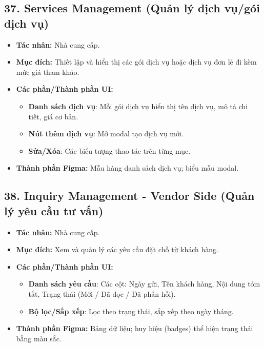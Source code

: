 \documentclass[11pt,a4paper]{article}
\begin{document}
\subsection{37. Services Management (Quản lý dịch vụ/gói dịch vụ)}
\begin{itemize}
    \item \textbf{Tác nhân:} Nhà cung cấp.
    \item \textbf{Mục đích:} Thiết lập và hiển thị các gói dịch vụ hoặc dịch vụ đơn lẻ đi kèm mức giá tham khảo.
    \item \textbf{Các phần/Thành phần UI:}
    \begin{itemize}
        \item \textbf{Danh sách dịch vụ}: Mỗi gói dịch vụ hiển thị tên dịch vụ, mô tả chi tiết, giá cơ bản.
        \item \textbf{Nút thêm dịch vụ}: Mở modal tạo dịch vụ mới.
        \item \textbf{Sửa/Xóa}: Các biểu tượng thao tác trên từng mục.
    \end{itemize}
    \item \textbf{Thành phần Figma:} Mẫu hàng danh sách dịch vụ; biểu mẫu modal.
\end{itemize}

\subsection{38. Inquiry Management - Vendor Side (Quản lý yêu cầu tư vấn)}
\begin{itemize}
    \item \textbf{Tác nhân:} Nhà cung cấp.
    \item \textbf{Mục đích:} Xem và quản lý các yêu cầu đặt chỗ từ khách hàng.
    \item \textbf{Các phần/Thành phần UI:}
    \begin{itemize}
        \item \textbf{Danh sách yêu cầu}: Các cột: Ngày gửi, Tên khách hàng, Nội dung tóm tắt, Trạng thái (Mới / Đã đọc / Đã phản hồi).
        \item \textbf{Bộ lọc/Sắp xếp}: Lọc theo trạng thái, sắp xếp theo ngày tháng.
    \end{itemize}
    \item \textbf{Thành phần Figma:} Bảng dữ liệu; huy hiệu (badges) thể hiện trạng thái bằng màu sắc.
\end{itemize}
\end{document}
